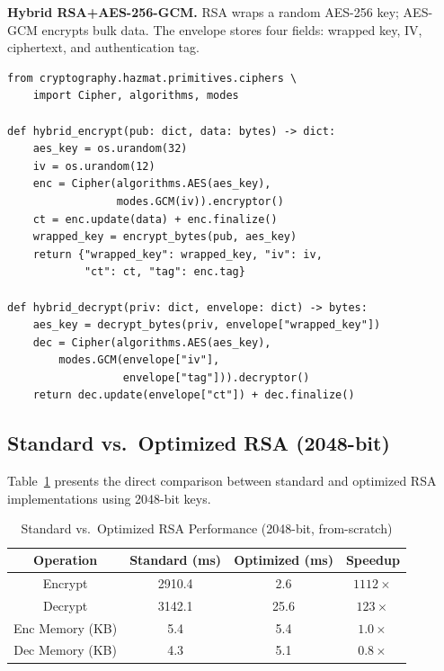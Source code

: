 \documentclass[journal]{IEEEtran}
\begin{document}
\textbf{Hybrid RSA+AES-256-GCM.}
RSA wraps a random AES-256 key; AES-GCM encrypts bulk data. The envelope stores four fields: wrapped key, IV, ciphertext, and authentication tag.

\begin{lstlisting}
from cryptography.hazmat.primitives.ciphers \
    import Cipher, algorithms, modes

def hybrid_encrypt(pub: dict, data: bytes) -> dict:
    aes_key = os.urandom(32)
    iv = os.urandom(12)
    enc = Cipher(algorithms.AES(aes_key),
                 modes.GCM(iv)).encryptor()
    ct = enc.update(data) + enc.finalize()
    wrapped_key = encrypt_bytes(pub, aes_key)
    return {"wrapped_key": wrapped_key, "iv": iv,
            "ct": ct, "tag": enc.tag}

def hybrid_decrypt(priv: dict, envelope: dict) -> bytes:
    aes_key = decrypt_bytes(priv, envelope["wrapped_key"])
    dec = Cipher(algorithms.AES(aes_key),
        modes.GCM(envelope["iv"],
                  envelope["tag"])).decryptor()
    return dec.update(envelope["ct"]) + dec.finalize()
\end{lstlisting}
\vspace{-2mm}
\label{lst:hybrid}

\subsection{Standard vs.\ Optimized RSA (2048-bit)}

Table~\ref{tab:std_vs_opt} presents the direct comparison between standard and optimized RSA implementations using 2048-bit keys.

\begin{table}[H]
\caption{Standard vs.\ Optimized RSA Performance (2048-bit, from-scratch)}
\label{tab:std_vs_opt}
\centering
\begin{tabular}{|c|c|c|c|}
\hline
\textbf{Operation} & \textbf{Standard (ms)} & \textbf{Optimized (ms)} & \textbf{Speedup} \\
\hline
Encrypt & 2910.4 & 2.6 & $1112\times$ \\
\hline
Decrypt & 3142.1 & 25.6 & $123\times$ \\
\hline
Enc Memory (KB) & 5.4 & 5.4 & $1.0\times$ \\
\hline
Dec Memory (KB) & 4.3 & 5.1 & $0.8\times$ \\
\hline
\end{tabular}
\end{table}
\end{document}
